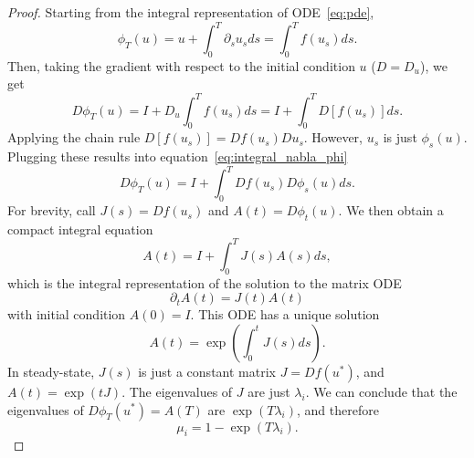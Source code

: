 \documentclass{article}
\begin{document}
	\begin{proof}
		Starting from the integral representation of ODE~\eqref{eq:pde},
		\begin{equation*}
			\phi_T(u) = u + \int_{0}^{T} \partial_s u_s ds = \int_{0}^{T} f\left(u_s\right) ds.
		\end{equation*}
		Then, taking the gradient with respect to the initial condition $u$ ($D=D_u$), we get
		\begin{equation} \label{eq:integral_nabla_phi}
			D \phi_T(u) = I + D_u \int_{0}^{T} f\left(u_s\right) ds = I + \int_{0}^{T} D \left[f\left(u_s\right) \right]ds.
		\end{equation}
		Applying the chain rule $D \left[f\left(u_s\right) \right] = D f\left(u_s\right) D u_s$. However, $u_s$ is just $\phi_s(u)$. Plugging these results into equation~\eqref{eq:integral_nabla_phi}
		\begin{equation*}
			D \phi_T(u) = I + \int_{0}^{T} D f\left(u_s\right) D \phi_s(u) ds.
		\end{equation*}
		For brevity, call $J(s) = D f(u_s)$ and $A(t) = D \phi_t(u)$. We then obtain a compact integral equation
		\begin{equation*}
			A(t) = I + \int_{0}^{T} J(s) A(s) ds,
    	\end{equation*}
    	which is the integral representation of the solution to the matrix ODE
    	\begin{equation} \label{eq:matrix_ode}
    		\partial_t A(t) = J(t) A(t)
    	\end{equation}
	   with initial condition $A(0)=I$. This ODE has a unique solution
    	\begin{equation*}
    		A(t) = \exp\left(\int_{0}^t J(s) ds\right).
    	\end{equation*}
	   In steady-state, $J(s)$ is just a constant matrix $J=D f(u^*) $, and $A(t) = \exp\left(t J \right) $. The eigenvalues of $J$ are just $\lambda_i$.  We can conclude that the eigenvalues of $D \phi_T(u^*)=A(T)$ are $\exp\left(T \lambda_i \right)$, and therefore
	\begin{equation*}
		\mu_i = 1- \exp\left(T \lambda_i \right).
	\end{equation*}
\end{proof}
\end{document}
